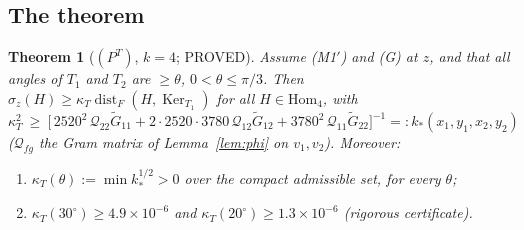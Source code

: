 \documentclass[11pt]{article}
\newtheorem{theorem}{Theorem}[section]
\theoremstyle{remark}
\begin{document}
\subsection{The theorem}
\begin{theorem}[$(P^T)$, $k=4$; PROVED]\label{thm:PT}
Assume (M1$'$) and (G) at $z$, and that all angles of $T_1$ and $T_2$ are $\ge\theta$, $0<\theta\le\pi/3$. Then
$\sigma_z(H)\ge\kappa_T\operatorname{dist}_F(H,\operatorname{Ker}_{T_1})$ for all $H\in\mathrm{Hom}_4$, with
\[
\kappa_T^2\ \ge\ \Big[\,2520^2\,\mathcal Q_{22}\tilde G_{11}+2\cdot2520\cdot3780\,\mathcal Q_{12}\tilde G_{12}+3780^2\,\mathcal Q_{11}\tilde G_{22}\Big]^{-1}=:k_\ast(x_1,y_1,x_2,y_2)
\]
($\mathcal Q_{fg}$ the Gram matrix of Lemma~\ref{lem:phi} on $v_1,v_2$). Moreover:
\begin{enumerate}
\item[(a)] $\kappa_T(\theta):=\min k_\ast^{1/2}>0$ over the compact admissible set, for every $\theta$;
\item[(b)] $\kappa_T(30^\circ)\ge4.9\times10^{-6}$ and $\kappa_T(20^\circ)\ge1.3\times10^{-6}$ (rigorous certificate).
\end{enumerate}
\end{theorem}
\end{document}
